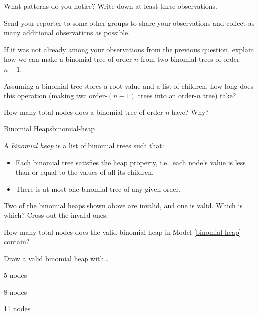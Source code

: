 \documentclass{tufte-handout}
\begin{document}
\begin{questions}
\item What patterns do you notice?  Write down at least three
  observations.

\item Send your reporter to some other groups to share your
  observations and collect as many additional observations as possible.

\item If it was not already among your observations from the previous
  question, explain how we can make a binomial tree of order $n$ from
  two binomial trees of order $n - 1$. \label{binomial-merge}

\item Assuming a binomial tree stores a root value and a list of
  children, how long does this operation (making two order-$(n-1)$ trees
  into an order-$n$ tree) take?

\item How many total nodes does a binomial tree of order $n$ have?
  Why?

\begin{model}{Binomial Heaps}{binomial-heap}
  \begin{defn}
    A \emph{binomial heap} is a list of binomial trees such that:
    \begin{itemize}
    \item Each binomial tree satisfies the heap property, i.e., each node's value is less than or equal to the values of all its children.
    \item There is at most one binomial tree of any given order.
    \end{itemize}
  \end{defn}
  \begin{center}
    
  \end{center}
  \label{binomial-heap}
\end{model}

\item Two of the binomial heaps shown above are invalid, and one is
  valid.  Which is which?  Cross out the invalid ones.

\item How many total nodes does the valid binomial heap in Model
  \ref{binomial-heap} contain?

\item Draw a valid binomial heap with\dots
  \begin{subquestions}
  \item 5 nodes
  \item 8 nodes
  \item 11 nodes
  \end{subquestions}


\end{questions}
\end{document}
